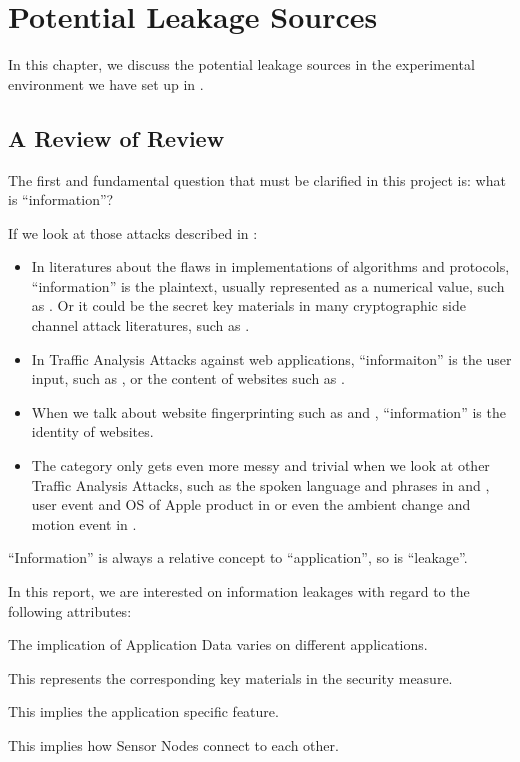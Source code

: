 \chapter{Potential Leakage Sources}

In this chapter, we discuss the potential leakage sources in the experimental environment we have set up in . 

\section{A Review of Review}

The first and fundamental question that must be clarified in this project is: what is ``information''?

If we look at those attacks described in :

\begin{itemize}
	\item In literatures about the flaws in implementations of algorithms and protocols, ``information'' is the plaintext, usually represented as a numerical value, such as \cite{802154sec} \cite{rfc7457} \cite{CompressionRatioAttack} \cite{PaddingOracle}. Or it could be the secret key materials in many cryptographic side channel attack literatures, such as \cite{DPA}.
	\item In Traffic Analysis Attacks against web applications, ``informaiton'' is the user input, such as \cite{PinpointWeb} \cite{SearchAttack}, or the content of websites such as \cite{WebSideChannel}.
	\item When we talk about website fingerprinting such as \cite{WebsiteFingerprint} \cite{Peekaboo} and \cite{PClassifier}, ``information'' is the identity of websites. 
	\item The category only gets even more messy and trivial when we look at other Traffic Analysis Attacks, such as the spoken language and phrases in \cite{VoIPLanguage} and \cite{VoIPPhrases}, user event and OS of Apple product in \cite{AppleMessage} or even the ambient change and motion event in \cite{Video}.
\end{itemize}

``Information'' is always a relative concept to ``application'', so is ``leakage''. 

In this report, we are interested on information leakages with regard to the following attributes:

\begin{description}[style=nextline]
	\item[Content and Size of Application Data]
	The implication of Application Data varies on different applications.
	
	\item[Cryptographic Key]
	This represents the corresponding key materials in the security measure.
	
	\item[Application Code Routine]
	This implies the application specific feature.
	
	\item[Network Topology]
	This implies how Sensor Nodes connect to each other.
\end{description}

